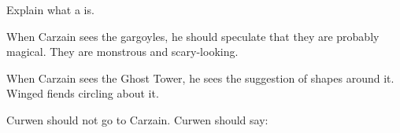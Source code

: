 \begin{changes}
\begin{comment}
    \paragraph{\Forclin}
  \end{comment}
  \changesitem{\Forclin}
    Explain what a \bacconate is.
    
    When Carzain sees the gargoyles, he should speculate that they are probably magical.
    They are monstrous and scary-looking.
    
    When Carzain sees the Ghost Tower, he sees the suggestion of shapes around it.
    Winged fiends circling about it. 
    
    Curwen should not go to Carzain.
    Curwen should say: 
\end{changes}









